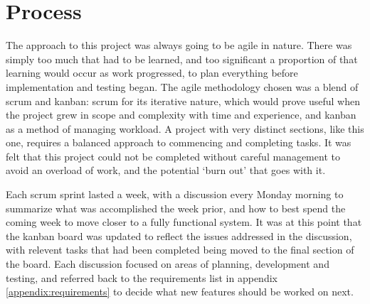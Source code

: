 \documentclass[11pt,a4paper]{book}
\begin{document}
\section{Process}
The approach to this project was always going to be agile in nature. There was simply too much that had to be learned, and too significant a proportion of that learning would occur as work progressed, to plan everything before implementation and testing began. The agile methodology chosen was a blend of scrum and kanban: scrum for its iterative nature, which would prove useful when the project grew in scope and complexity with time and experience, and kanban as a method of managing workload. A project with very distinct sections, like this one, requires a balanced approach to commencing and completing tasks. It was felt that this project could not be completed without careful management to avoid an overload of work, and the potential `burn out' that goes with it. 

Each scrum sprint lasted a week, with a discussion every Monday morning to summarize what was accomplished the week prior, and how to best spend the coming week to move closer to a fully functional system. It was at this point that the kanban board was updated to reflect the issues addressed in the discussion, with relevent tasks that had been completed being moved to the final section of the board. Each discussion focused on areas of planning, development and testing, and referred back to the requirements list in appendix \ref{appendix:requirements} to decide what new features should be worked on next. 
\end{document}
